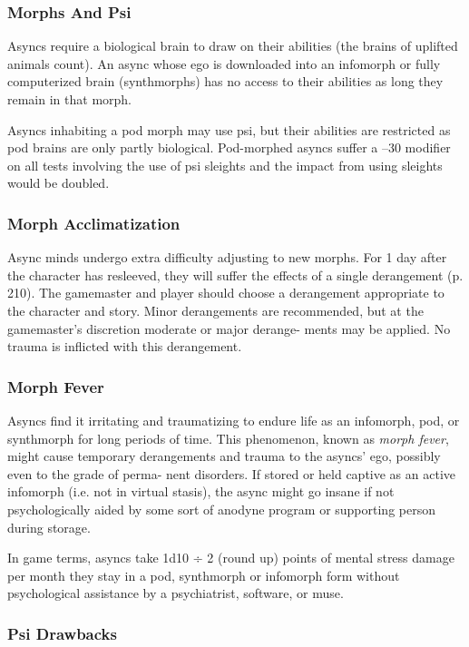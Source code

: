 \subsubsection{Morphs And Psi}

Asyncs require a biological brain to draw on their 
abilities (the brains of uplifted animals count). An 
async whose ego is downloaded into an infomorph or 
fully computerized brain (synthmorphs) has no access 
to their abilities as long they remain in that morph.

Asyncs inhabiting a pod morph may use psi, but 
their abilities are restricted as pod brains are only 
partly biological. Pod-morphed asyncs suffer a –30 
modifier on all tests involving the use of psi sleights 
and the impact from using sleights would be doubled.

\subsubsection{Morph Acclimatization}

Async minds undergo extra difficulty adjusting to new 
morphs. For 1 day after the character has resleeved, 
they will suffer the effects of a single derangement 
(p. 210). The gamemaster and player should choose a 
derangement appropriate to the character and story. 
Minor derangements are recommended, but at the 
gamemaster's discretion moderate or major derange-
ments may be applied. No trauma is inflicted with 
this derangement.

\subsubsection{Morph Fever}

Asyncs find it irritating and traumatizing to endure life 
as an infomorph, pod, or synthmorph for long periods 
of time. This phenomenon, known as \textit{morph fever}, 
might cause temporary derangements and trauma to 
the asyncs' ego, possibly even to the grade of perma-
nent disorders. If stored or held captive as an active 
infomorph (i.e. not in virtual stasis), the async might 
go insane if not psychologically aided by some sort of 
anodyne program or supporting person during storage.

In game terms, asyncs take 1d10 ÷ 2 (round up) 
points of mental stress damage per month they stay 
in a pod, synthmorph or infomorph form without 
psychological assistance by a psychiatrist, software, 
or muse.

\subsubsection{Psi Drawbacks}

